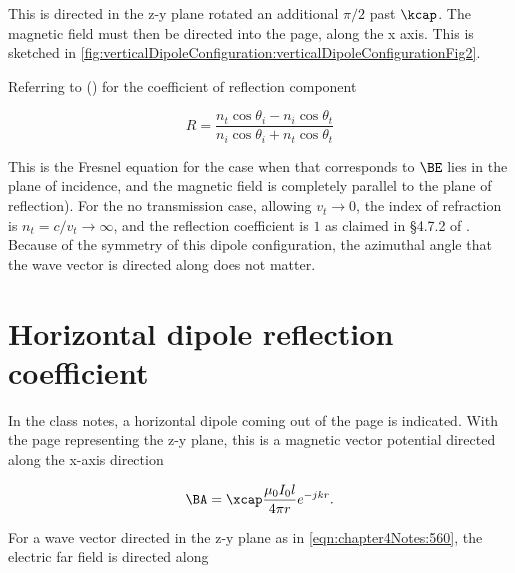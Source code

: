 This is directed in the z-y plane rotated an additional \( \pi/2 \) past \( \kcap \).  The magnetic field must then be directed into the page, along the x axis.  This is sketched in \cref{fig:verticalDipoleConfiguration:verticalDipoleConfigurationFig2}.


Referring to \citep{hecht1998hecht} () for the coefficient of reflection component

\begin{dmath}\label{eqn:chapter4Notes:620}
R
=
\frac{
n_t \cos\theta_i - n_i \cos\theta_t
}
{
n_i \cos\theta_i + n_t \cos\theta_t
}
\end{dmath}

This is the Fresnel equation for the case when
that corresponds to
\( \BE \) lies in the plane of incidence, and the magnetic field is completely parallel to the plane of reflection).  For the no transmission case, allowing \( v_t \rightarrow 0 \), the index of refraction is \( n_t = c/v_t \rightarrow \infty \), and the reflection coefficient is \( 1 \) as claimed in \S 4.7.2 of \citep{balanis2005antenna}.  Because of the symmetry of this dipole configuration, the azimuthal angle that the wave vector is directed along does not matter.

\section{Horizontal dipole reflection coefficient}

In the class notes, a horizontal dipole coming out of the page is indicated.  With the page representing the z-y plane, this is a magnetic vector potential directed along the x-axis direction

\begin{equation}\label{eqn:chapter4Notes:640}
\BA = \xcap \frac{\mu_0 I_0 l}{4 \pi r} e^{-j k r}.
\end{equation}

For a wave vector directed in the z-y plane as in \cref{eqn:chapter4Notes:560}, the electric far field is directed along


